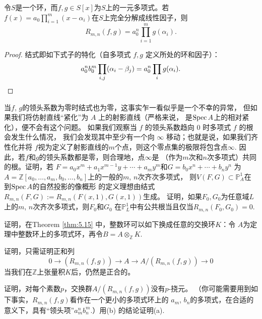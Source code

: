 \begin{coro}\label{coro:5.17}
令$S$是一个环，而$f,g\in S[x]$为$S$上的一元多项式。若
$f(x)=a_0 \prod_{i=1}^m(x-\alpha_i)$在$S$上完全分解成线性因子，则
\[
    R_{m, n}(f, g)=a_0^n \prod_{i=1}^m g(\alpha_i).
\]
\end{coro}

\begin{proof}
结式即如下式子的特化（自多项式 $f,g$ 定义所处的环和因子）：
\[
    a_0^n b_0^m \prod_{i, j}(\alpha_i-\beta_j)=a_0^n \prod_i g(\alpha_i).
    \qedhere
\]
\end{proof}


\begin{exa}\label{exa:5.18}
    当$f$, $g$的领头系数为零时结式也为零，这事实乍一看似乎是一个不幸的异常，
    但如果我们将仿射直线“紧化”为 $A$ 上的射影直线（严格来说，
    是$\operatorname{Spec} A$上的相对紧化），便不会有这个问题。
    如果我们观察当 $f$ 的领头系数趋向 $0$ 时多项式 $f$ 的根会发生什么情况，
    我们会发现其中至少有一个向 $\infty$ 移动；也就是说，如果我们齐性化并将
    $f$视为定义了射影直线的$m$个点，则这个零点集的极限将包含点$\infty$.
    因此，若$f$和$g$的领头系数都是零，则合理地，点$\infty$是
    （作为$m$次和$n$次多项式）共同的根。证明，若
    $F=a_0x^m+a_1x^{m-1}y+\cdots+a_my^m$和$G=b_0x^n+\cdots+b_ny^n$
    为$A=\mathbb Z[a_0,\dots,a_m,b_0,\dots,b_n]$上的一般的$m$, $n$次齐次多项式，
    则$V(F,G)\subset \mathbb P_A^1$在到$\operatorname{Spec} A$的自然投影的像概形
    的定义理想由结式$R_{m,n}(F,G):=R_{m,n}(F(x,1),G(x,1))$生成。
    证明，如果$F_0,G_0$为任意域$L$上的$m$, $n$次齐次多项式，则$F_0$和$G_0$
    在$\mathbb P_{L}^1$中有公共根当且仅当$R_{m,n}(F_0,G_0)=0$.
\end{exa}

\begin{exe}\label{exe:5.19}
    证明，在Theorem \ref{thm:5.15} 中，整数环可以如下换成任意的交换环$K$：令
    $A$为定理中整数环上的多项式环，再令$B=A\otimes_{\mathbb Z}K$.

    \begin{compactenum}[(a)]
        \item 证明，只需证明正和列
        \[
            0 \to(R_{m, n}(f, g)) \to A \to A /(R_{m, n}(f, g)) \to 0
        \]
        当我们在$\mathbb Z$上张量积$K$后，仍然是正合的。
        \item 证明，对每个素数$p$，交换群$A/(R_{m,n}(f,g))$没有$p$-挠元。
        （你可能需要用到如下事实，$R_{m,n}(f,g)$看作在一个更小的多项式环上的
        $a_m$, $b_n$的多项式，在合适的意义下，具有“领头项”$a_m^nb_n^m$.）用(b)
        的结论证明(a).
    \end{compactenum}

\end{exe}

